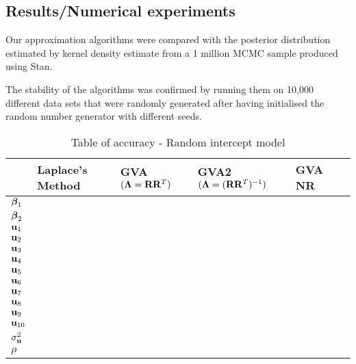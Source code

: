 \documentclass{article}[12pt]
\begin{document}

\subsection{Results/Numerical experiments}\label{sec:results}

Our approximation algorithms were compared with the posterior distribution estimated
by kernel density estimate from a 1 million MCMC sample produced using Stan.

\noindent The stability of the algorithms was confirmed by running them on 10,000 
different data sets that were randomly generated after having initialised the random 
number generator with different seeds.

\begin{table}
\label{tab:accuracy_int}
\caption{Table of accuracy - Random intercept model}
\begin{tabular}{l|lllll}
\hline
& Laplace's Method & GVA $({\boldsymbol \Lambda} = {\bf R} {\bf R}^T)$ & GVA2 $({\boldsymbol \Lambda} = ({\bf R} {\bf R}^T)^{-1})$ & GVA NR\\
\hline
${\boldsymbol \beta}_1$ & & & & & \\
${\boldsymbol \beta}_2$ & & & & & \\
${\bf u}_1$ & & & & & \\ 
${\bf u}_2$ & & & & & \\
${\bf u}_3$ & & & & & \\
${\bf u}_4$ & & & & & \\
${\bf u}_5$ & & & & & \\
${\bf u}_6$ & & & & & \\
${\bf u}_7$ & & & & & \\
${\bf u}_8$ & & & & & \\
${\bf u}_9$ & & & & & \\
${\bf u}_{10}$ & & & & & \\
$\sigma^2_{\bf u}$ & & & & & \\
$\rho$ & & & & & \\
\hline
\end{tabular}
\end{table}
\end{document}
